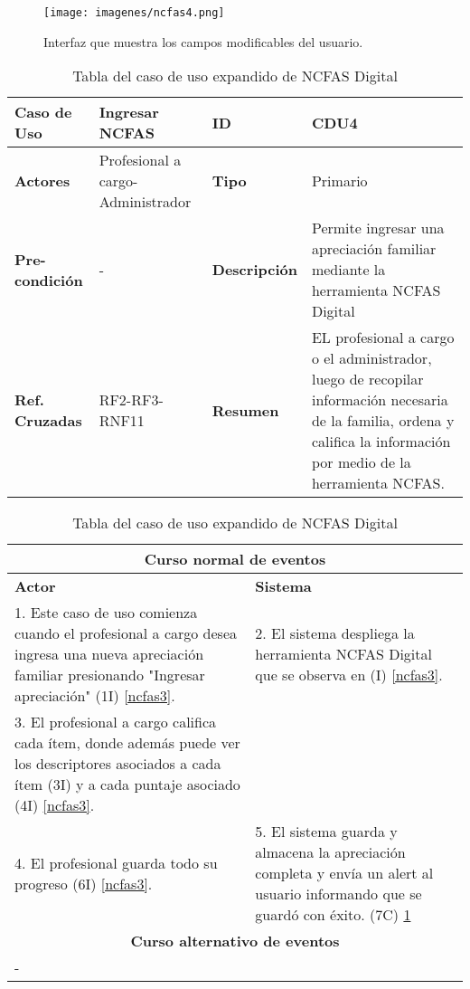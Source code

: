 \begin{figure}[h!]
	\label{ncfas4}
	\begin{center}
		\texttt{[image: imagenes/ncfas4.png]}
	\end{center}
	\caption{Interfaz que muestra los campos modificables del usuario.}
\end{figure}


\begin{table}[h!]
	\centering
	\begin{tabular}{|p{2cm}|p{3cm}|p{2cm}|p{4cm}|}
		\hline \textbf{Caso de Uso} & Ingresar NCFAS & \textbf{ID} & CDU4 \\ 
		\hline \textbf{Actores} & Profesional a cargo- Administrador & \textbf{Tipo} & Primario \\ 
		\hline \textbf{Pre-condición} & - & \textbf{Descripción} & Permite ingresar una apreciación familiar mediante la herramienta NCFAS Digital \\
		\hline \textbf{Ref. Cruzadas} & RF2-RF3-RNF11 & \textbf{Resumen} & EL profesional a cargo o el administrador, luego de recopilar información necesaria de la familia, ordena y califica la información por medio de la herramienta NCFAS.\\ 
		\hline
	\end{tabular}  
	\begin{tabular}{|p{6cm}|p{6cm}|}
		
		\multicolumn{2}{|c|}{\textbf{Curso normal de eventos}} \\
		\hline \textbf{Actor} & \textbf{Sistema} \\ 
		\hline 1. Este caso de uso comienza cuando el profesional a cargo desea ingresa una nueva apreciación familiar presionando "Ingresar apreciación" (1I) \ref{ncfas3}. & 2. El sistema despliega la herramienta NCFAS Digital que se observa en (I) \ref{ncfas3}.  \\ 
		3. El profesional a cargo califica cada ítem, donde además puede ver los descriptores asociados a cada ítem (3I) y a cada puntaje asociado (4I) \ref{ncfas3}.&  \\
		4. El profesional guarda todo su progreso (6I) \ref{ncfas3}. & 5. El sistema guarda y almacena la apreciación completa y envía un alert al usuario informando que se guardó con éxito. (7C) \ref{ncfas4} \\
		\hline
		\multicolumn{2}{|c|}{\textbf{Curso alternativo de eventos}} \\
		\hline
		\multicolumn{2}{|p{12cm}|}{-} \\
		\hline
	\end{tabular}
	\caption{Tabla del caso de uso expandido de NCFAS Digital}
	\label{tabcdu44}
\end{table}

